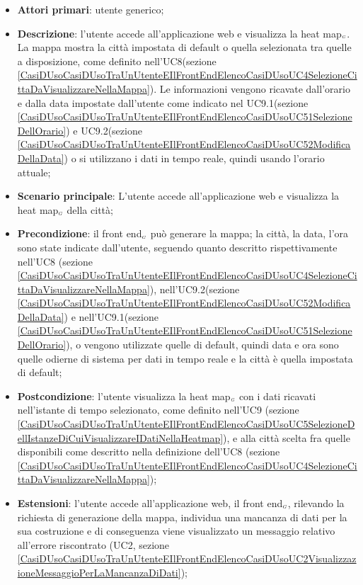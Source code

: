 \begin{itemize}
	\item \textbf{Attori primari}: utente generico;
	\item \textbf{Descrizione}: l’utente accede all’applicazione web e visualizza la heat map$_{\scaleto{G}{3pt}}$. La mappa mostra la città impostata di default o quella selezionata tra quelle a disposizione, come definito nell’UC8(sezione \ref{CasiDUsoCasiDUsoTraUnUtenteEIlFrontEndElencoCasiDUsoUC4SelezioneCittaDaVisualizzareNellaMappa}). Le informazioni vengono ricavate dall’orario e dalla data impostate dall’utente come indicato nel UC9.1(sezione \ref{CasiDUsoCasiDUsoTraUnUtenteEIlFrontEndElencoCasiDUsoUC51SelezioneDellOrario}) e UC9.2(sezione \ref{CasiDUsoCasiDUsoTraUnUtenteEIlFrontEndElencoCasiDUsoUC52ModificaDellaData}) o si utilizzano i dati in tempo reale, quindi usando l’orario attuale;
	\item \textbf{Scenario principale}: L’utente accede all’applicazione web e visualizza la heat map$_{\scaleto{G}{3pt}}$ della città;
	\item \textbf{Precondizione}: il front end$_{\scaleto{G}{3pt}}$ può generare la mappa; la città, la data, l’ora sono state indicate dall’utente, seguendo quanto descritto rispettivamente nell'UC8 (sezione \ref{CasiDUsoCasiDUsoTraUnUtenteEIlFrontEndElencoCasiDUsoUC4SelezioneCittaDaVisualizzareNellaMappa}), nell'UC9.2(sezione \ref{CasiDUsoCasiDUsoTraUnUtenteEIlFrontEndElencoCasiDUsoUC52ModificaDellaData}) e nell'UC9.1(sezione \ref{CasiDUsoCasiDUsoTraUnUtenteEIlFrontEndElencoCasiDUsoUC51SelezioneDellOrario}), o vengono utilizzate quelle di default, quindi data e ora sono quelle odierne di sistema per dati in tempo reale e la città è quella impostata di default;
	\item \textbf{Postcondizione}: l’utente visualizza la heat map$_{\scaleto{G}{3pt}}$ con i dati ricavati nell’istante di tempo selezionato, come definito nell’UC9 (sezione \ref{CasiDUsoCasiDUsoTraUnUtenteEIlFrontEndElencoCasiDUsoUC5SelezioneDellIstanzeDiCuiVisualizzareIDatiNellaHeatmap}), e alla città scelta fra quelle disponibili come descritto nella definizione dell’UC8 (sezione \ref{CasiDUsoCasiDUsoTraUnUtenteEIlFrontEndElencoCasiDUsoUC4SelezioneCittaDaVisualizzareNellaMappa});
	\item \textbf{Estensioni}: l’utente accede all’applicazione web, il front end$_{\scaleto{G}{3pt}}$, rilevando la richiesta di generazione della mappa, individua una mancanza di dati per la sua costruzione e di conseguenza viene visualizzato un messaggio relativo all’errore riscontrato (UC2, sezione \ref{CasiDUsoCasiDUsoTraUnUtenteEIlFrontEndElencoCasiDUsoUC2VisualizzazioneMessaggioPerLaMancanzaDiDati});
\end{itemize}

